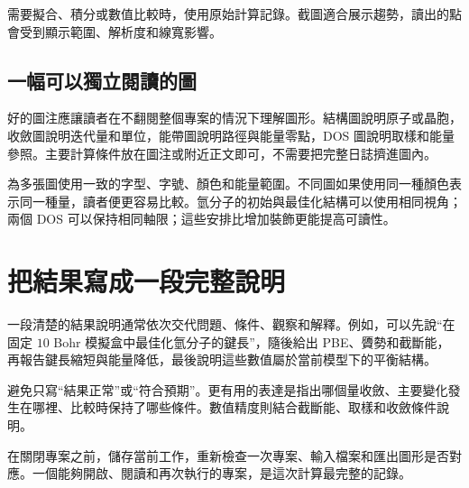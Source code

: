 需要擬合、積分或數值比較時，使用原始計算記錄。截圖適合展示趨勢，讀出的點會受到顯示範圍、解析度和線寬影響。

\subsection{一幅可以獨立閱讀的圖}

好的圖注應讓讀者在不翻閱整個專案的情況下理解圖形。結構圖說明原子或晶胞，收斂圖說明迭代量和單位，能帶圖說明路徑與能量零點，DOS 圖說明取樣和能量參照。主要計算條件放在圖注或附近正文即可，不需要把完整日誌擠進圖內。

為多張圖使用一致的字型、字號、顏色和能量範圍。不同圖如果使用同一種顏色表示同一種量，讀者便更容易比較。氫分子的初始與最佳化結構可以使用相同視角；兩個 DOS 可以保持相同軸限；這些安排比增加裝飾更能提高可讀性。

\section{把結果寫成一段完整說明}

一段清楚的結果說明通常依次交代問題、條件、觀察和解釋。例如，可以先說“在固定 $10$ Bohr 模擬盒中最佳化氫分子的鍵長”，隨後給出 PBE、贗勢和截斷能，再報告鍵長縮短與能量降低，最後說明這些數值屬於當前模型下的平衡結構。

避免只寫“結果正常”或“符合預期”。更有用的表達是指出哪個量收斂、主要變化發生在哪裡、比較時保持了哪些條件。數值精度則結合截斷能、取樣和收斂條件說明。

在關閉專案之前，儲存當前工作，重新檢查一次專案、輸入檔案和匯出圖形是否對應。一個能夠開啟、閱讀和再次執行的專案，是這次計算最完整的記錄。

